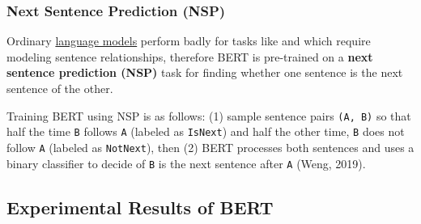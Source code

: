 \subsubsection{Next Sentence Prediction (NSP)} \label{sec:nextsentencepredictionNSP}

Ordinary \hyperref[sec:LanguageModels]{language models} perform badly for tasks like  and  which require modeling sentence relationships, therefore BERT is pre-trained on a \textbf{next sentence prediction (NSP)} task for finding whether one sentence is the next sentence of the other. 

Training BERT using NSP is as follows: (1) sample sentence pairs \texttt{(A, B)} so that half the time \texttt{B} follows \texttt{A} (labeled as \texttt{IsNext}) and half the other time, \texttt{B} does not follow \texttt{A} (labeled as \texttt{NotNext}), then (2) BERT processes both sentences and uses a binary classifier to decide of \texttt{B} is the next sentence after \texttt{A} (Weng, 2019). 


\subsection{Experimental Results of BERT} \label{sec:BERTExperimentalResults}

